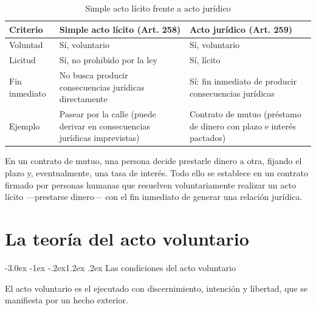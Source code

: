 \documentclass[12pt,oneside]{book}
\makeatletter
\renewcommand\section{\@startsection{section}{1}{\z@}%
  {-3.0ex \@plus -1ex \@minus -.2ex}{1.2ex \@plus .2ex}%
  {\normalfont\large\bfseries\color{acento}}}
\makeatother
\begin{document}
\begin{table}[H]
\centering
\caption{Simple acto lícito frente a acto jurídico}
\begin{tabularx}{\textwidth}{l X X}
\toprule
\textbf{Criterio} & \textbf{Simple acto lícito (Art. 258)} & \textbf{Acto jurídico (Art. 259)} \\
\midrule
Voluntad & Sí, voluntario & Sí, voluntario \\
Licitud & Sí, no prohibido por la ley & Sí, lícito \\
Fin inmediato & No busca producir consecuencias jurídicas directamente & Sí: fin inmediato de producir consecuencias jurídicas \\
Ejemplo & Pasear por la calle (puede derivar en consecuencias jurídicas imprevistas) & Contrato de mutuo (préstamo de dinero con plazo e interés pactados) \\
\bottomrule
\end{tabularx}
\end{table}

\begin{ejemplo}
En un contrato de mutuo, una persona decide prestarle dinero a otra, fijando el plazo y, eventualmente, una tasa de interés. Todo ello se establece en un contrato firmado por personas humanas que resuelven voluntariamente realizar un acto lícito ---prestarse dinero--- con el fin inmediato de generar una relación jurídica.
\end{ejemplo}


\chapter{La teoría del acto voluntario}
\section{Las condiciones del acto voluntario}

\begin{definicion}
El acto voluntario es el ejecutado con discernimiento, intención y libertad, que se manifiesta por un hecho exterior.
\end{definicion}
\end{document}
